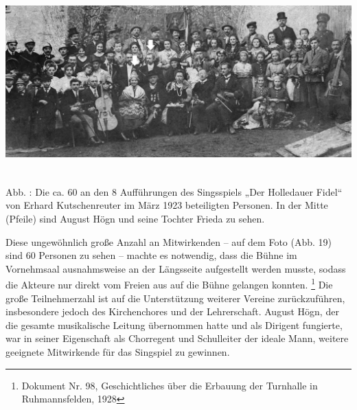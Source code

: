 \documentclass[a4paper]{article}
\newcounter{Abb}
\renewcommand\theAbb{\arabic{Abb}}
\begin{document}
\includegraphics[width=15.993cm,height=7.015cm]{pictures/zulassungsarbeit-img021.jpg}


\label{bkm:Ref100050511}Abb. \stepcounter{Abb}{\theAbb}: Die ca. 60 an
den 8 Aufführungen des Singsspiels „Der Holledauer Fidel“ von Erhard
Kutschenreuter im März 1923 beteiligten Personen. In der Mitte (Pfeile)
sind August Högn und seine Tochter Frieda zu sehen.

Diese ungewöhnlich große Anzahl an Mitwirkenden – auf dem Foto (Abb. 19)
sind 60 Personen zu sehen – machte es notwendig, dass die Bühne im
Vornehmsaal ausnahmsweise an der Längsseite aufgestellt werden musste,
sodass die Akteure nur direkt vom Freien aus auf die Bühne gelangen
konnten. \footnote{Dokument Nr. 98, Geschichtliches über die Erbauung
der Turnhalle in Ruhmannsfelden, 1928} Die große Teilnehmerzahl ist auf
die Unterstützung weiterer Vereine zurückzuführen, insbesondere jedoch
des Kirchenchores und der Lehrerschaft. August Högn, der die gesamte
musikalische Leitung übernommen hatte und als Dirigent fungierte, war
in seiner Eigenschaft als Chorregent und Schulleiter der ideale Mann,
weitere geeignete Mitwirkende für das Singspiel zu gewinnen.
\end{document}
